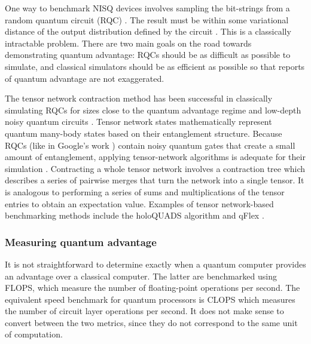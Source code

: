 \documentclass[10pt]{iopart}
\begin{document}
One way to benchmark NISQ devices involves sampling the bit-strings from a random quantum circuit (RQC) \cite{Boixo2018,Villalonga2019}. The result must be within some variational distance of the output distribution defined by the circuit \cite{Bouland2019}. This is a classically intractable problem. There are two main goals on the road towards demonstrating quantum advantage: RQCs should be as difficult as possible to simulate, and classical simulators should be as efficient as possible so that reports of quantum advantage are not exaggerated. 

The tensor network contraction method has been successful in classically simulating RQCs for sizes close to the quantum advantage regime \cite{Wahl2023,Huang2021} and low-depth noisy quantum circuits \cite{Zhou2020x,Orus2019t,Ran2021}. Tensor network states mathematically represent quantum many-body states based on their entanglement structure. Because RQCs (like in Google's work \cite{Arute2019}) contain noisy quantum gates that create a small amount of entanglement, applying tensor-network algorithms is adequate for their simulation \cite{Zhou2020x}. Contracting a whole tensor network involves a contraction tree which describes a series of pairwise merges that turn the network into a single tensor. It is analogous to performing a series of sums and multiplications of the tensor entries to obtain an expectation value. Examples of tensor network-based benchmarking methods include the holoQUADS algorithm \cite{FossFeig2021,FossFeig2022} and qFlex \cite{Villalonga2019}.

\subsubsection{Measuring quantum advantage}\hfill

It is not straightforward to determine exactly when a quantum computer provides an advantage over a classical computer. The latter are benchmarked using FLOPS, which measure the number of floating-point operations per second. The equivalent speed benchmark for quantum processors is CLOPS which measures the number of circuit layer operations per second. It does not make sense to convert between the two metrics, since they do not correspond to the same unit of computation. 
\end{document}
